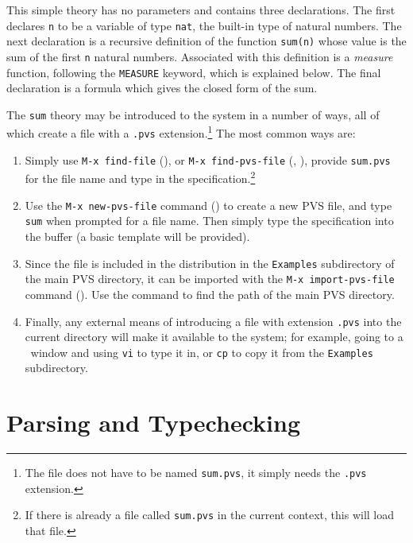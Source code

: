 This simple theory has no parameters and contains three declarations.  The
first declares \texttt{n} to be a variable of type \texttt{nat}, the
built-in type of natural numbers.  The next declaration is a recursive
definition of the function \texttt{sum(n)} whose value is the sum of the
first \texttt{n} natural numbers.  Associated with this definition is a
\emph{measure} function, following the \texttt{MEASURE} keyword, which is
explained below.  The final declaration is a formula which gives the
closed form of the sum.

The \texttt{sum} theory may be introduced to the system in a number of
ways, all of which create a file with a \texttt{.pvs}
extension.\footnote{The file does not have to be named \texttt{sum.pvs}, it
simply needs the \texttt{.pvs} extension.}  The most common ways are:
\begin{enumerate}

\item Simply use \texttt{M-x find-file} (), or \texttt{M-x
find-pvs-file} (, ), provide \texttt{sum.pvs} for
the file name and type in the specification.\footnote{If there is already
a file called \texttt{sum.pvs} in the current context, this will load that
file.}

\item Use the \texttt{M-x new-pvs-file} command () to create a
new PVS file, and type \texttt{sum} when prompted for a file name.  Then
simply type the specification into the buffer (a basic template will be provided). 

\item Since the file is included in the distribution in the
\texttt{Examples} subdirectory of the main PVS directory, it can be
imported with the \texttt{M-x import-pvs-file} command ().  Use
the  command to find the path of the main PVS directory.

\item Finally, any external means of introducing a file with extension
\texttt{.pvs} into the current directory will make it available to the
system; for example, going to a \unix\ window and using \texttt{vi} to
type it in, or \texttt{cp} to copy it from the \texttt{Examples}
subdirectory.

\end{enumerate}

\section{Parsing and Typechecking}


